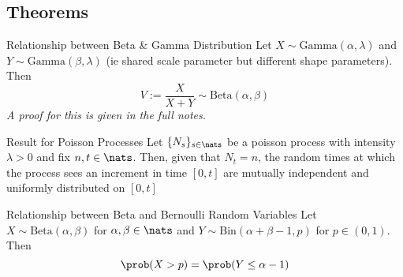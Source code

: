 \documentclass[11pt,a4paper]{article}
\begin{document}
\subsection{Theorems}

  \begin{theorem}{Relationship between Beta \& Gamma Distribution}
    Let $X\sim\text{Gamma}(\alpha,\lambda)$ and $Y\sim\text{Gamma}(\beta,\lambda)$ (ie shared scale parameter but different shape parameters). Then
    \[ V:=\frac{X}{X+Y}\sim\text{Beta}(\alpha,\beta) \]
    \textit{A proof for this is given in the full notes.}
  \end{theorem}

  \begin{theorem}{Result for Poisson Processes}
    Let $\{N_s\}_{s\in\nats}$ be a poisson process with intensity $\lambda>0$ and fix $n,t\in\nats$. Then, given that $N_t=n$, the random times at which the process sees an increment in time $[0,t]$ are mutually independent and uniformly distributed on $[0,t]$
  \end{theorem}

  \begin{theorem}{Relationship between Beta and Bernoulli Random Variables}
    Let $X\sim\text{Beta}(\alpha,\beta)$ for $\alpha,\beta\in\nats$ and $Y\sim\text{Bin}(\alpha+\beta-1,p)$ for $p\in(0,1)$. Then
    \[ \prob(X>p)=\prob(Y\leq\alpha-1) \]
  \end{theorem}
\end{document}

